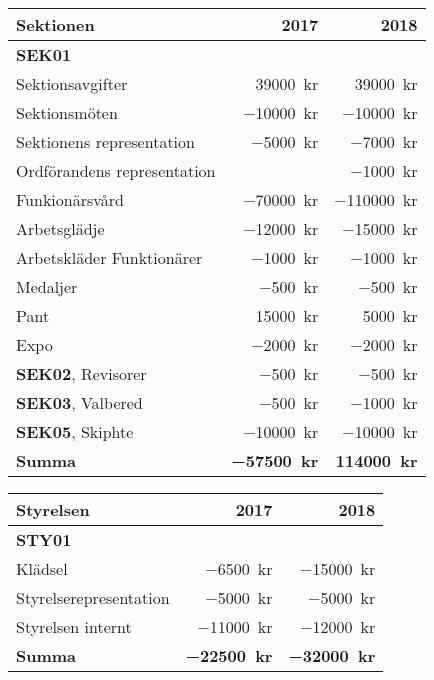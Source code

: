 \documentclass[10pt]{article}
\begin{document}
\section*{\doctitle}
\begin{tabularx}{10cm}{X r r}
    \textbf{\large Sektionen} & \textbf{2017} & \textbf{2018} \\
    \hline
    \textbf{SEK01} \\
    Sektionsavgifter & \SI{39000}{kr} & \SI{39000}{kr} \\
    Sektionsmöten & \SI{-10000}{kr} & \SI{-10000}{kr} \\
    Sektionens representation & \SI{-5000}{kr} & \SI{-7000}{kr} \\
    Ordförandens representation & & \SI{-1000}{kr} \\
    Funkionärsvård & \SI{-70000}{kr} & \SI{-110000}{kr} \\
    Arbetsglädje & \SI{-12000}{kr} & \SI{-15000}{kr} \\
    Arbetskläder Funktionärer & \SI{-1000}{kr} & \SI{-1000}{kr} \\
    Medaljer & \SI{-500}{kr} & \SI{-500}{kr} \\
    Pant & \SI{15000}{kr} & \SI{5000}{kr} \\
    Expo & \SI{-2000}{kr} & \SI{-2000}{kr} \\
    \textbf{SEK02}, Revisorer & \SI{-500}{kr} & \SI{-500}{kr} \\
    \textbf{SEK03}, Valbered & \SI{-500}{kr} & \SI{-1000}{kr} \\
    \textbf{SEK05}, Skiphte & \SI{-10000}{kr} & \SI{-10000}{kr} \\
    \hline
    \textbf{Summa} & \textbf{\SI{-57500}{kr}} & \textbf{\SI{114000}{kr}} \\
\end{tabularx}

\begin{tabularx}{10cm}{X r r}
    \textbf{\large Styrelsen} & \textbf{2017} & \textbf{2018} \\
    \hline
    \textbf{STY01} \\
    Klädsel & \SI{-6500}{kr} & \SI{-15000}{kr} \\
    Styrelserepresentation & \SI{-5000}{kr} & \SI{-5000}{kr} \\
    Styrelsen internt & \SI{-11000}{kr} & \SI{-12000}{kr} \\
    \hline
    \textbf{Summa} & \textbf{\SI{-22500}{kr}} & \textbf{\SI{-32000}{kr}} \\
\end{tabularx}
\end{document}

